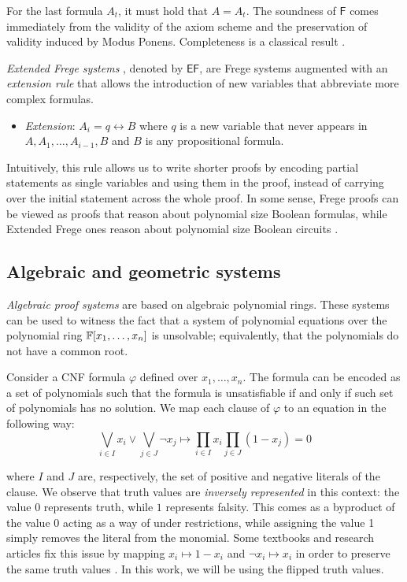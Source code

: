 For the last formula $A_t$, it must hold that $A = A_t$. The soundness of $\mathsf{F}$ comes immediately from the validity of the axiom scheme and the preservation of validity induced by Modus Ponens. Completeness is a classical result \cite{logic_book}.

\textit{Extended Frege systems} \cite{cook_proof_compx,reckhow}, denoted by $\mathsf{EF}$, are Frege systems augmented with an \textit{extension rule} that allows the introduction of new variables that abbreviate more complex formulas.
\begin{itemize}
    \item \textit{Extension}: $A_i = q \leftrightarrow B$ where $q$ is a new variable that never appears in $A, A_1, \ldots, A_{i-1}, B$ and $B$ is any propositional formula.
\end{itemize}

Intuitively, this rule allows us to write shorter proofs by encoding partial statements as single variables and using them in the proof, instead of carrying over the initial statement across the whole proof. In some sense, Frege proofs can be viewed as proofs that reason about polynomial size Boolean
formulas, while Extended Frege ones reason about polynomial size Boolean circuits \cite{kraj_book,jukna}.

\subsection{Algebraic and geometric systems}

\textit{Algebraic proof systems} are based on algebraic polynomial rings. 
These systems can be used to witness the fact that a system of polynomial equations over the polynomial ring $\mathbb{F}[x_1, \ldots, x_n]$ is unsolvable; equivalently, that the polynomials do not have a common root.

Consider a CNF formula $\varphi$ defined over $x_1, \ldots, x_n$. The formula can be encoded as a set of polynomials such that the formula is unsatisfiable if and only if such set of polynomials has no solution. We map each clause of $\varphi$ to an equation in the following way:
\begin{equation}
    \bigvee_{i \in I} x_i \lor \bigvee_{j \in J} \lnot x_j \mapsto \prod_{i \in I} x_i \prod_{j \in J} (1-x_j) = 0
\end{equation}

where $I$ and $J$ are, respectively, the set of positive and negative literals of the clause. We observe that truth values are \textit{inversely represented} in this context: the value $0$ represents truth, while $1$ represents falsity. This comes as a byproduct of the value 0 acting as a way of  under restrictions, while assigning the value 1 simply removes the literal from the monomial. Some textbooks and research articles fix this issue by mapping $x_i \mapsto 1- x_i$ and $\lnot x_i \mapsto x_i$ in order to preserve the same truth values \cite{kraj_book,alg_nphard}. In this work, we will be using the flipped truth values. 

